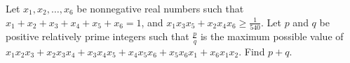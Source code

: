 Let $x_1,x_2,\dots ,x_6$ be nonnegative real numbers such that $x_1+x_2+x_3+x_4+x_5+x_6=1$, and $x_1x_3x_5+x_2x_4x_6 \geq \frac{1}{540}$. Let $p$ and $q$ be positive relatively prime integers such that $\frac{p}{q}$ is the maximum possible value of $x_1x_2x_3+x_2x_3x_4 + x_3x_4x_5 + x_4x_5x_6 + x_5x_6x_1 + x_6x_1x_2$. Find $p+q$.